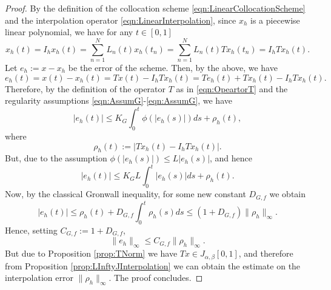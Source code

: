 \documentclass[12pt,a4paper]{article}
\begin{document}
\begin{proof}
	By the definition of the collocation scheme \eqref{eqn:LinearCollocationScheme} and the interpolation operator \eqref{eqn:LinearInterpolation}, since $x_h$ is a piecewise linear polynomial, we have for any $t\in[0,1]$
	\begin{equation}
		x_h(t) = I_h x_h(t) = \sum_{n=1}^N L_n(t) x_h(t_n) = \sum_{n=1}^N L_n(t) Tx_h(t_n) = I_h Tx_h (t).
	\end{equation}	
	Let $e_h := x - x_h$ be the error of the scheme. Then, by the above, we have
	\begin{equation}
		e_h(t) = x(t) - x_h(t) = Tx(t) - I_h Tx_h(t) = Te_h(t) + Tx_h(t) - I_h T x_h(t).
	\end{equation}
	Therefore, by the definition of the operator $T$ as in \eqref{eqn:OpeartorT} and the regularity assumptions \eqref{eqn:AssumG}-\eqref{eqn:AssumG}, we have
	\begin{equation}
		|e_h(t)| \leq K_G \int_0^t \phi(|e_h(s)|) ds + \rho_h(t),
	\end{equation}
	where 
	\begin{equation}
		\rho_h(t) := |Tx_h(t) - I_h T x_h(t)|. 
	\end{equation}
	But, due to the assumption $\phi(|e_h(s)|) \leq L |e_h(s)|$, and hence
	\begin{equation}
		|e_h(t)| \leq K_G L \int_0^t |e_h(s)|ds + \rho_h(t).
	\end{equation} 
	Now, by the classical Gronwall inequality, for some new constant $D_{G,f}$ we obtain
	\begin{equation}
		|e_h(t)| \leq \rho_h(t) + D_{G,f} \int_0^t \rho_h(s) ds \leq (1 + D_{G,f}) \|\rho_h\|_\infty. 
	\end{equation}
	Hence, setting $C_{G,f} := 1+ D_{G,f}$,
	\begin{equation}
		\|e_h\|_\infty \leq C_{G,f} \|\rho_h\|_\infty. 
	\end{equation}	
	But due to Proposition \ref{prop:TNorm} we have $Tx \in J_{\alpha,\beta}[0,1]$, and therefore from Proposition \ref{prop:LInftyJInterpolation} we can obtain the estimate on the interpolation error $\|\rho_h\|_\infty$. The proof concludes. 

\end{proof}
\end{document}
